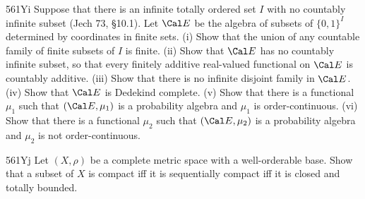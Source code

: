 {\spheader 561Yi Suppose that there is an infinite totally ordered set $I$
with no countably infinite subset ({\smc Jech 73}, \S10.1).   Let $\Cal E$
be the algebra of subsets of $\{0,1\}^I$ determined by coordinates in
finite sets.   (i) Show that the union of any countable family of finite 
subsets of $I$ is finite.   
(ii) Show that $\Cal E$ has no countably infinite subset, so
that every finitely additive real-valued functional on $\Cal E$ is
countably additive.   (iii) Show that there is no infinite disjoint
family in $\Cal E$.
(iv) Show that $\Cal E$ is Dedekind complete.   (v) Show that there
is a functional $\mu_1$ such that $(\Cal E,\mu_1)$ 
is a probability algebra and
$\mu_1$ is order-continuous.   (vi) Show that there is a functional
$\mu_2$ such that $(\Cal E,\mu_2)$ is a probability algebra and $\mu_2$ is
not order-continuous.

\spheader 561Yj Let $(X,\rho)$ be a complete metric space with a
well-orderable base.   Show that a subset of $X$ is compact iff it is
sequentially compact iff it is closed and totally bounded.
}%

